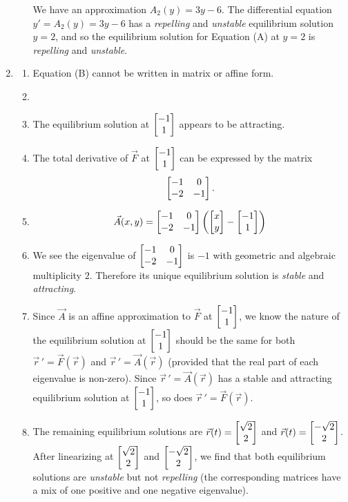 \begin{enumerate}
\begin{enumerate}
		            We have an approximation $A_{2}(y) = 3y-6$. The differential equation $y'=A_{2}(y)=3y-6$ has
		            a \emph{repelling} and \emph{unstable} equilibrium solution $y=2$, and so the equilibrium solution
		            for Equation (A) at $y=2$ is \emph{repelling} and \emph{unstable}.
	      \end{enumerate}
	\item \begin{enumerate}
		      \item Equation (B) cannot be written in matrix or affine form.
		      \item
		      \item The equilibrium solution at $\begin{bmatrix}-1\\1\end{bmatrix}$ appears to be attracting.
		      \item The total derivative of $\vec F$ at $\begin{bmatrix}-1\\1\end{bmatrix}$ can be expressed by the matrix
		            \[
			            \begin{bmatrix}-1&0\\-2&-1\end{bmatrix}.
		            \]
		      \item \[
			            \vec A(x,y) = \begin{bmatrix}-1&0\\-2&-1\end{bmatrix}\left(\begin{bmatrix}x\\y\end{bmatrix}-\begin{bmatrix}-1\\1\end{bmatrix}\right)
		            \]
		      \item We see the eigenvalue of $\begin{bmatrix}-1&0\\-2&-1\end{bmatrix}$ is $-1$ with geometric and algebraic multiplicity $2$.
		            Therefore its unique equilibrium solution is \emph{stable} and \emph{attracting}.
		      \item Since $\vec A$ is an affine approximation to $\vec F$ at $\begin{bmatrix}-1\\1\end{bmatrix}$, we know the nature
		            of the equilibrium solution at $\begin{bmatrix}-1\\1\end{bmatrix}$ should be the same for both $\vec r\,'=\vec F(\vec r)$
		            and $\vec r\,'=\vec A(\vec r)$ (provided that the real part of each eigenvalue is non-zero).
		            Since $\vec r\,'=\vec A(\vec r)$ has a stable and attracting equilibrium solution at $\begin{bmatrix}-1\\1\end{bmatrix}$,
		            so does $\vec r\,'=\vec F(\vec r)$.

		      \item The remaining equilibrium solutions are $\vec r(t)=\begin{bmatrix}\sqrt{2}\\2\end{bmatrix}$ and $\vec r(t)=\begin{bmatrix}-\sqrt{2}\\2\end{bmatrix}$.
		            After linearizing at $\begin{bmatrix}\sqrt{2}\\2\end{bmatrix}$ and $\begin{bmatrix}-\sqrt{2}\\2\end{bmatrix}$, we find that both equilibrium solutions
		            are \emph{unstable} but not \emph{repelling} (the corresponding matrices have a mix of one positive and one negative eigenvalue).

	      \end{enumerate}
\end{enumerate}